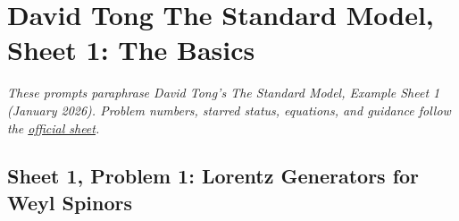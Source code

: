 \section{David Tong The Standard Model, Sheet 1: The Basics}

\noindent\textit{These prompts paraphrase David Tong's \emph{The Standard Model},
Example Sheet 1 (January 2026). Problem numbers, starred status, equations,
and guidance follow the
\href{https://davidtong.org/pdfs/teaching/standard-model/rw1.pdf}{official sheet}.}

\subsection{Sheet 1, Problem 1: Lorentz Generators for Weyl Spinors}

